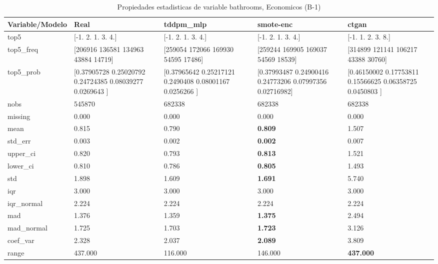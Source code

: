 \begin{table}[H]
\centering
\fontsize{8}{14}\selectfont
\caption{Propiedades  estadisticas de variable bathrooms, Economicos (B-1)}
\label{table-stats-economicos-b-1-bathrooms}
\begin{tabular}{|l|m{10em}|m{10em}|m{10em}|m{10em}|}
\hline
 \rowcolor[gray]{0.8}
Variable/Modelo & Real & tddpm\_mlp & smote-enc & ctgan \\
\hline top5 & [-1.  2.  1.  3.  4.] & [-1.  2.  1.  3.  4.] & [-1.  2.  1.  3.  4.] & [-1.  1.  2.  3.  8.] \\
\hline top5\_freq & [206916 136581 134963  43884  14719] & [259054 172066 169930  54595  17486] & [259244 169905 169037  54569  18539] & [314899 121141 106217  43388  30760] \\
\hline top5\_prob & [0.37905728 0.25020792 0.24724385 0.08039277 0.0269643 ] & [0.37965642 0.25217121 0.2490408  0.08001167 0.0256266 ] & [0.37993487 0.24900416 0.24773206 0.07997356 0.02716982] & [0.46150002 0.17753811 0.15566625 0.06358725 0.0450803 ] \\
\hline nobs & 545870 & 682338 & 682338 & 682338 \\
\hline missing & 0.000 & 0.000 & 0.000 & 0.000 \\
\hline mean & 0.815 & 0.790 & \bfseries 0.809 & \cellcolor[rgb]{0.9, 0.54, 0.52} 1.507 \\
\hline std\_err & 0.003 & 0.002 & \bfseries 0.002 & \cellcolor[rgb]{0.9, 0.54, 0.52} 0.007 \\
\hline upper\_ci & 0.820 & 0.793 & \bfseries 0.813 & \cellcolor[rgb]{0.9, 0.54, 0.52} 1.521 \\
\hline lower\_ci & 0.810 & 0.786 & \bfseries 0.805 & \cellcolor[rgb]{0.9, 0.54, 0.52} 1.493 \\
\hline std & 1.898 & 1.609 & \bfseries 1.691 & \cellcolor[rgb]{0.9, 0.54, 0.52} 5.740 \\
\hline iqr & 3.000 & 3.000 & 3.000 & 3.000 \\
\hline iqr\_normal & 2.224 & 2.224 & 2.224 & 2.224 \\
\hline mad & 1.376 & 1.359 & \bfseries 1.375 & \cellcolor[rgb]{0.9, 0.54, 0.52} 2.494 \\
\hline mad\_normal & 1.725 & 1.703 & \bfseries 1.723 & \cellcolor[rgb]{0.9, 0.54, 0.52} 3.126 \\
\hline coef\_var & 2.328 & 2.037 & \bfseries 2.089 & \cellcolor[rgb]{0.9, 0.54, 0.52} 3.809 \\
\hline range & 437.000 & \cellcolor[rgb]{0.9, 0.54, 0.52} 116.000 & 146.000 & \bfseries 437.000 \\

\end{tabular}
\end{table}
